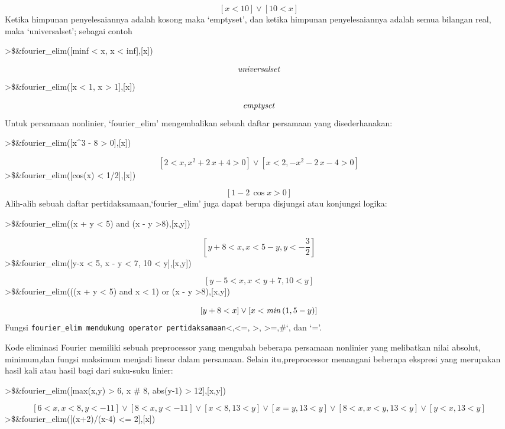\documentclass[
]{book}
\begin{document}
\[\left[ x<10 \right] \lor \left[ 10<x \right] \]Ketika himpunan penyelesaiannya adalah kosong maka `emptyset', dan ketika himpunan penyelesaiannya adalah semua bilangan real, maka `universalset'; sebagai contoh

\textgreater\$\&fourier\_elim({[}minf \textless{} x, x \textless{} inf{]},{[}x{]})

\[{\it universalset}\]\textgreater\$\&fourier\_elim({[}x \textless{} 1, x \textgreater{} 1{]},{[}x{]})

\[{\it emptyset}\]Untuk persamaan nonlinier, `fourier\_elim' mengembalikan sebuah daftar persamaan yang disederhanakan:

\textgreater\$\&fourier\_elim({[}x\^{}3 - 8 \textgreater{} 0{]},{[}x{]})

\[\left[ 2<x , x^2+2\,x+4>0 \right] \lor \left[ x<2 , -x^2-2\,x-4>0
  \right] \]\textgreater\$\&fourier\_elim({[}cos(x) \textless{} 1/2{]},{[}x{]})

\[\left[ 1-2\,\cos x>0 \right] \]Alih-alih sebuah daftar pertidaksamaan,`fourier\_elim' juga dapat berupa disjungsi atau konjungsi logika:

\textgreater\$\&fourier\_elim((x + y \textless{} 5) and (x - y \textgreater8),{[}x,y{]})

\[\left[ y+8<x , x<5-y , y<-\frac{3}{2} \right] \]\textgreater\$\&fourier\_elim({[}y-x \textless{} 5, x - y \textless{} 7, 10 \textless{} y{]},{[}x,y{]})

\[\left[ y-5<x , x<y+7 , 10<y \right] \]\textgreater\$\&fourier\_elim(((x + y \textless{} 5) and x \textless{} 1) or (x - y \textgreater8),{[}x,y{]})

\[\left[ y+8<x \right] \lor \left[ x<{\it min}\left(1 , 5-y\right)
  \right] \]Fungsi \texttt{fourier\_elim\textquotesingle{}\ mendukung\ operator\ pertidaksamaan}\textless,\textless=, \textgreater, \textgreater=,\#`, dan `='.

Kode eliminasi Fourier memiliki sebuah preprocessor yang mengubah beberapa persamaan nonlinier yang melibatkan nilai absolut, minimum,dan fungsi maksimum menjadi linear dalam persamaan. Selain itu,preprocessor menangani beberapa ekspresi yang merupakan hasil kali atau hasil bagi dari suku-suku linier:

\textgreater\$\&fourier\_elim({[}max(x,y) \textgreater{} 6, x \# 8, abs(y-1) \textgreater{} 12{]},{[}x,y{]})

\[\left[ 6<x , x<8 , y<-11 \right] \lor \left[ 8<x , y<-11 \right] 
 \lor \left[ x<8 , 13<y \right] \lor \left[ x=y , 13<y \right] \lor 
 \left[ 8<x , x<y , 13<y \right] \lor \left[ y<x , 13<y \right] \]\textgreater\$\&fourier\_elim({[}(x+2)/(x-4) \textless= 2{]},{[}x{]})
\end{document}
